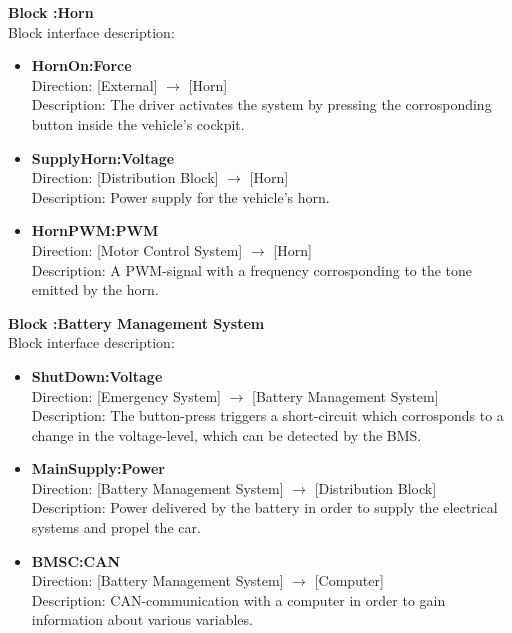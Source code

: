 \textbf{Block :Horn}\\
Block interface description:
\begin{itemize}
	\item \textbf{HornOn:Force}\\
	Direction: [External] $\rightarrow$ [Horn]\\
	Description: The driver activates the system by pressing the corrosponding button inside the vehicle's cockpit.
	\item \textbf{SupplyHorn:Voltage}\\
	Direction: [Distribution Block] $\rightarrow$ [Horn]\\
	Description: Power supply for the vehicle's horn.
	\item \textbf{HornPWM:PWM}\\
	Direction: [Motor Control System] $\rightarrow$ [Horn]\\
	Description: A PWM-signal with a frequency corrosponding to the tone emitted by the horn.
\end{itemize}

\textbf{Block :Battery Management System}\\
Block interface description:
\begin{itemize}
	\item \textbf{ShutDown:Voltage}\\
	Direction: [Emergency System] $\rightarrow$ [Battery Management System]\\
	Description: The button-press triggers a short-circuit which corrosponds to a change in the voltage-level, which can be detected by the BMS.
	\item \textbf{MainSupply:Power}\\
	Direction: [Battery Management System] $\rightarrow$ [Distribution Block]\\
	Description: Power delivered by the battery in order to supply the electrical systems and propel the car.
	\item \textbf{BMSC:CAN}\\
	Direction: [Battery Management System] $\rightarrow$ [Computer]\\
	Description: CAN-communication with a computer in order to gain information about various variables.
\end{itemize}

